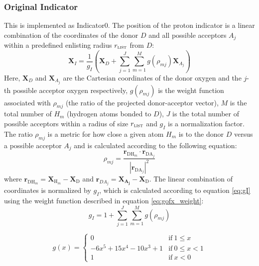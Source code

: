\documentclass{article}
\newcommand{\mb}[1]{\mathbf{#1}}
\newcommand{\mr}[1]{\mathrm{#1}}
\begin{document}
\subsubsection{Original Indicator}\label{ss:original_indicator}
This is implemented as Indicator0.
The position of the proton  indicator is a linear combination of the coordinates of the donor $D$ and all possible acceptors $A_j$ within a predefined enlisting radius $r_\mathrm{\textsc{list}}$ from $D$:
\begin{equation}
\mathbf{X}_I = \frac{1}{g_I} \left( \mathbf{X}_D + \sum^{J}_{j=1} \sum^{M}_{m=1} g \left( \rho_{mj} \right) \mathbf{X}_{A_j} \right)
\end{equation}
Here, $\mathbf{X}_D$ and $\mathbf{X}_{A_{j}}$ are the Cartesian coordinates of the donor oxygen and the $j$-th possible acceptor oxygen respectively, $g ( \rho_{mj} )$ is the weight function associated with $\rho_{mj}$ (the ratio of the projected donor-acceptor vector), $M$ is the total number of $H_m$ (hydrogen atoms bonded to $D$), $J$ is the total number of possible acceptors within a radius of size $r_\mathrm{\textsc{list}}$ and $g_I$ is a normalization factor.
The ratio $\rho_{mj}$ is a metric for how close a given atom $H_m$ is to the donor $D$ versus a possible acceptor $A_j$ and is calculated according to the following equation:
\begin{equation}
\rho_{mj}=\frac{ \mathbf{r}_{\mathrm{DH}_m} \cdot \mathbf{r}_{\mathrm{DA}_j} } { | \mathbf{r}_{\mathrm{DA}_j} |^2 }
\end{equation}
where $\mathbf{r}_{\mathrm{DH}_m} = \mb{X}_{\mathrm{H}_m} - \mb{X}_\mr{D}$ and $\mb{r}_{DA_j} = \mb{X_{A_j}} - \mb{X}_\mr{D}$.
The linear combination of coordinates is normalized by $g_I$, which is calculated according to equation \ref{eq:gI} using the weight function described in equation \ref{eq:gofx_weight}:
\begin{equation}\label{eq:gI}
g_I = 1 + \sum^J_{j=1} \sum^M_{m=1} g ( \rho_{mj} )
\end{equation}

\begin{equation} \label{eq:gofx_weight}
g(x) = \begin{cases}
0
& \mathrm{if}\ 1 \leq x \\
-6x^5 + 15x^4 - 10x^3 + 1
& \mathrm{if}\  0 \leq x < 1 \\
1
& \mathrm{if}\ x < 0 
\end{cases}
\end{equation}
\end{document}
